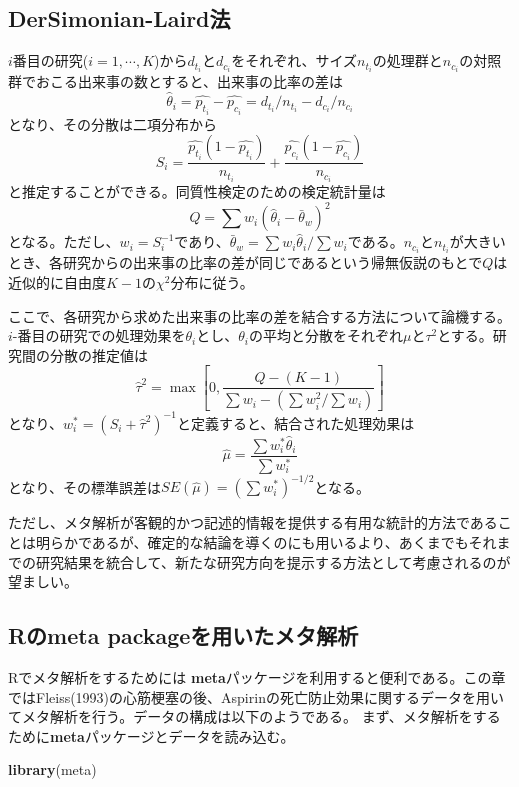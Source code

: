 \documentclass[]{article}
\newenvironment{Shaded}{\begin{snugshade}}{\end{snugshade}}
\newcommand{\KeywordTok}[1]{\textcolor[rgb]{0.13,0.29,0.53}{\textbf{{#1}}}}
\newcommand{\NormalTok}[1]{{#1}}
\begin{document}
\subsection{DerSimonian-Laird法}\label{dersimonian-laird}

$i$番目の研究($i = 1, \cdots, K$)から$d_{t_i}$と$d_{c_i}$をそれぞれ、サイズ$n_{t_i}$の処理群と$n_{c_i}$の対照群でおこる出来事の数とすると、出来事の比率の差は
\[
\hat \theta_i = \hat{p_{t_i}} - \hat{p_{c_i}} = d_{t_i} / n_{t_i} - d_{c_i} / n_{c_i}
\] となり、その分散は二項分布から \[
S_i = \frac{\hat{p_{t_i}} (1-  \hat{p_{t_i}})}{n_{t_i} }+ \frac{\hat{p_{c_i}} (1-  \hat{p_{c_i}})}{n_{c_i}} 
\] と推定することができる。同質性検定のための検定統計量は \[
Q= \sum w_i (\hat \theta_i - \bar\theta_w)^2
\]
となる。ただし、$w_i = S_i^{-1}$であり、$\bar\theta_w = {\sum w_i \hat\theta_i}/{\sum w_i}$である。$n_{c_i}$と$n_{t_i}$が大きいとき、各研究からの出来事の比率の差が同じであるという帰無仮説のもとで$Q$は近似的に自由度$K-1$の$\chi^2$分布に従う。

ここで、各研究から求めた出来事の比率の差を結合する方法について論機する。$i$-番目の研究での処理効果を$\theta_i$とし、$\theta_i$の平均と分散をそれぞれ$\mu$と$\tau^2$とする。研究間の分散の推定値は
\[
\hat\tau^2 = \max \left [ 0, \frac{Q-(K-1)}{\sum w_i - (\sum w_i^2 / \sum w_i)} \right ] 
\]
となり、$w_i^* = (S_i + \hat\tau^2)^{-1}$と定義すると、結合された処理効果は
\[
\hat\mu = \frac{\sum w_i^* \hat\theta_i}{\sum w_i^*}
\] となり、その標準誤差は$SE(\hat\mu) = (\sum w_i^*)^{-1/2}$となる。

ただし、メタ解析が客観的かつ記述的情報を提供する有用な統計的方法であることは明らかであるが、確定的な結論を導くのにも用いるより、あくまでもそれまでの研究結果を統合して、新たな研究方向を提示する方法として考慮されるのが望ましい。

\subsection{Rのmeta packageを用いたメタ解析}\label{rmeta-package}

Rでメタ解析をするためには
\textbf{meta}パッケージを利用すると便利である。この章ではFleiss(1993)の心筋梗塞の後、Aspirinの死亡防止効果に関するデータを用いてメタ解析を行う。データの構成は以下のようである。
まず、メタ解析をするために\textbf{meta}パッケージとデータを読み込む。

\begin{Shaded}
\begin{Highlighting}[]
\KeywordTok{library}\NormalTok{(meta)}
\end{Highlighting}
\end{Shaded}
\end{document}
